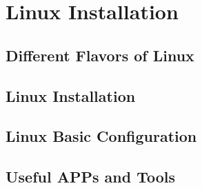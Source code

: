 \chapter{Linux Installation}

\section{Different Flavors of Linux}

\section{Linux Installation}

\section{Linux Basic Configuration}

\section{Useful APPs and Tools}
















